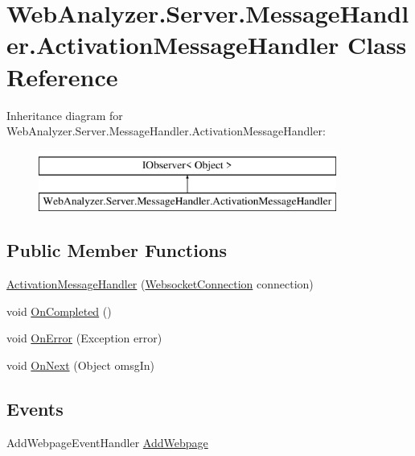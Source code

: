 \hypertarget{class_web_analyzer_1_1_server_1_1_message_handler_1_1_activation_message_handler}{}\section{Web\+Analyzer.\+Server.\+Message\+Handler.\+Activation\+Message\+Handler Class Reference}
\label{class_web_analyzer_1_1_server_1_1_message_handler_1_1_activation_message_handler}
Inheritance diagram for Web\+Analyzer.\+Server.\+Message\+Handler.\+Activation\+Message\+Handler\+:\begin{figure}[H]
\begin{center}
\leavevmode
\includegraphics[height=2.000000cm]{class_web_analyzer_1_1_server_1_1_message_handler_1_1_activation_message_handler}
\end{center}
\end{figure}
\subsection*{Public Member Functions}
\begin{DoxyCompactItemize}
\item 
\hyperlink{class_web_analyzer_1_1_server_1_1_message_handler_1_1_activation_message_handler_aa05ee6b24b05ef071e0f4fe6186f581c}{Activation\+Message\+Handler} (\hyperlink{class_web_analyzer_1_1_server_1_1_websocket_connection}{Websocket\+Connection} connection)
\item 
void \hyperlink{class_web_analyzer_1_1_server_1_1_message_handler_1_1_activation_message_handler_a7a5fa265a93c6f2b3aa97ddc1a1ab018}{On\+Completed} ()
\item 
void \hyperlink{class_web_analyzer_1_1_server_1_1_message_handler_1_1_activation_message_handler_af0709f385ad61869e7f5b3d04d9a5a78}{On\+Error} (Exception error)
\item 
void \hyperlink{class_web_analyzer_1_1_server_1_1_message_handler_1_1_activation_message_handler_a5dc2879ba556e923bb24a7d5cb36d322}{On\+Next} (Object omsg\+In)
\end{DoxyCompactItemize}
\subsection*{Events}
\begin{DoxyCompactItemize}
\item 
Add\+Webpage\+Event\+Handler \hyperlink{class_web_analyzer_1_1_server_1_1_message_handler_1_1_activation_message_handler_aeab84864e057b34b024a8b8a11f3e135}{Add\+Webpage}
\end{DoxyCompactItemize}
